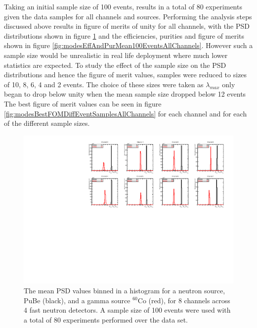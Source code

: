 Taking an initial sample size of 100 events, results in a total of 80 experiments given the data samples for all channels and sources. Performing the analysis steps discussed above results in figure of merits of unity for all channels, with the PSD distributions shown in figure \ref{fig:modesPSDMean100EventsAllChannels} and the efficiencies, purities and figure of merits shown in figure \ref{fig:modesEffAndPurMean100EventsAllChannels}. However such a sample size would be unrealistic in real life deployment where much lower statistics are expected. To study the effect of the sample size on the PSD distributions and hence the figure of merit values, samples were reduced to sizes of 10, 8, 6, 4 and 2 events. The choice of these sizes were taken as $\lambda_{max}$ only began to drop below unity when the mean sample size dropped below 12 events  The best figure of merit values can be seen in figure \ref{fig:modesBestFOMDiffEventSamplesAllChannels} for each channel and for each of the different sample sizes.

\begin{figure}[htbp]
\begin{center}
\includegraphics[width=160mm]{Chapter8/figures/psd_allChannels_pube_co60_mean100Events_80Experiments.pdf}
\caption{The mean PSD values binned in a histogram for a neutron source, PuBe (black), and a gamma source $^{60}$Co (red), for 8 channels across 4 fast neutron detectors. A sample size of 100 events were used with a total of 80 experiments performed over the data set.}
\label{fig:modesPSDMean100EventsAllChannels}
\end{center}
\end{figure}

